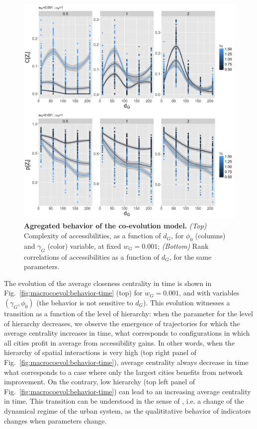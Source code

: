 \documentclass[11pt]{article}
\begin{document}
\begin{figure}
\includegraphics[width=\linewidth]{figures/6-2-2-fig-macrocoevol-behavior-aggreg.jpg}
\caption{\textbf{Agregated behavior of the co-evolution model.} \textit{(Top)} Complexity of accessibilities, as a function of $d_G$, for $\phi_0$ (columns) and $\gamma_G$ (color) variable, at fixed $w_G = 0.001$; \textit{(Bottom)} Rank correlations of accessibilities as a function of $d_G$, for the same parameters.\label{fig:macrocoevol:behavior-aggreg}}
\end{figure}


The evolution of the average closeness centrality in time is shown in Fig.~\ref{fig:macrocoevol:behavior-time} (top) for $w_G = 0.001$, and with variables $(\gamma_G,\phi_0)$ (the behavior is not sensitive to $d_G$). This evolution witnesses a transition as a function of the level of hierarchy: when the parameter for the level of hierarchy decreases, we observe the emergence of trajectories for which the average centrality increases in time, what corresponds to configurations in which all cities profit in average from accessibility gains. In other words, when the hierarchy of spatial interactions is very high (top right panel of Fig.~\ref{fig:macrocoevol:behavior-time}), average centrality always decrease in time what corresponds to a case where only the largest cities benefits from network improvement. On the contrary, low hierarchy (top left panel of Fig.~\ref{fig:macrocoevol:behavior-time}) can lead to an increasing average centrality in time. This transition can be understood in the sense of \cite{sanders2017peupler}, i.e. a change of the dynamical regime of the urban system, as the qualititative behavior of indicators changes when parameters change.
\end{document}
